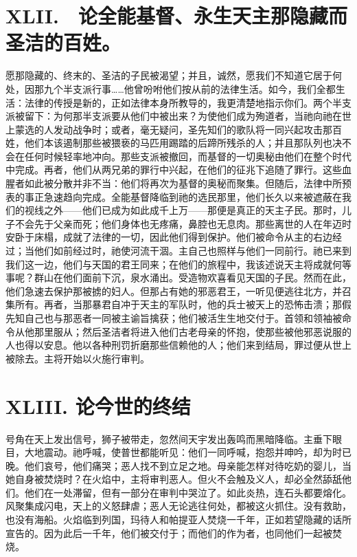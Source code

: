 \section{XLII.　论全能基督、永生天主那隐藏而圣洁的百姓。}

愿那隐藏的、终末的、圣洁的子民被渴望；并且，诚然，愿我们不知道它居于何处，因那九个半支派行事……他曾吩咐他们按从前的法律生活。如今，我们全都生活：法律的传授是新的，正如法律本身所教导的，我更清楚地指示你们。两个半支派被留下：为何那半支派要从他们中被出来？为使他们成为殉道者，当祂向祂在世上蒙选的人发动战争时；或者，毫无疑问，圣先知们的歌队将一同兴起攻击那百姓，他们本该遏制那些被猥亵的马匹用踢踏的后蹄所残杀的人；并且那队列也决不会在任何时候轻率地冲向。那些支派被撤回，而基督的一切奥秘由他们在整个时代中完成。再者，他们从两兄弟的罪行中兴起，在他们的征兆下追随了罪行。这些血腥者如此被分散并非不当：他们将再次为基督的奥秘而聚集。但随后，法律中所预表的事正急速趋向完成。全能基督降临到祂的选民那里，他们长久以来被遮蔽在我们的视线之外——他们已成为如此成千上万——那便是真正的天主子民。那时，儿子不会先于父亲而死；他们身体也无疼痛，鼻腔也无息肉。那些离世的人在年迈时安卧于床榻，成就了法律的一切，因此他们得到保护。他们被命令从主的右边经过；当他们如前经过时，祂使河流干涸。主自己也照样与他们一同前行。祂已来到我们这一边，他们与天国的君王同来；在他们的旅程中，我该述说天主将成就何等事呢？群山在他们面前下沉，泉水涌出。受造物欢喜看见天国的子民。然而在此，他们急速去保护那被掳的妇人。但那占有她的邪恶君王，一听见便逃往北方，并召集所有。再者，当那暴君自冲于天主的军队时，他的兵士被天上的恐怖击溃；那假先知自己也与那恶者一同被主谕旨擒获；他们被活生生地交付于。首领和领袖被命令从他那里服从；然后圣洁者将进入他们古老母亲的怀抱，使那些被他邪恶说服的人也得以安息。他以各种刑罚折磨那些信赖他的人；他们来到结局，罪过便从世上被除去。主将开始以火施行审判。\par


\section{XLIII. 论今世的终结}

号角在天上发出信号，狮子被带走，忽然间天宇发出轰鸣而黑暗降临。主垂下眼目，大地震动。祂呼喊，使普世都能听见：他们一同呼喊，抱怨并呻吟，却为时已晚。他们哀号，他们痛哭；恶人找不到立足之地。母亲能怎样对待吃奶的婴儿，当她自身被焚烧时？在火焰中，主将审判恶人。但火不会触及义人，却必全然舔舐他们。他们在一处滞留，但有一部分在审判中哭泣了。如此炎热，连石头都要熔化。风聚集成闪电，天上的义怒肆虐；恶人无论逃往何处，都被这火抓住。没有救助，也没有海船。火焰临到列国，玛待人和帕提亚人焚烧一千年，正如若望隐藏的话所宣告的。因为此后一千年，他们被交付于；而他们的作为者，也同他们一起被焚烧。\par

